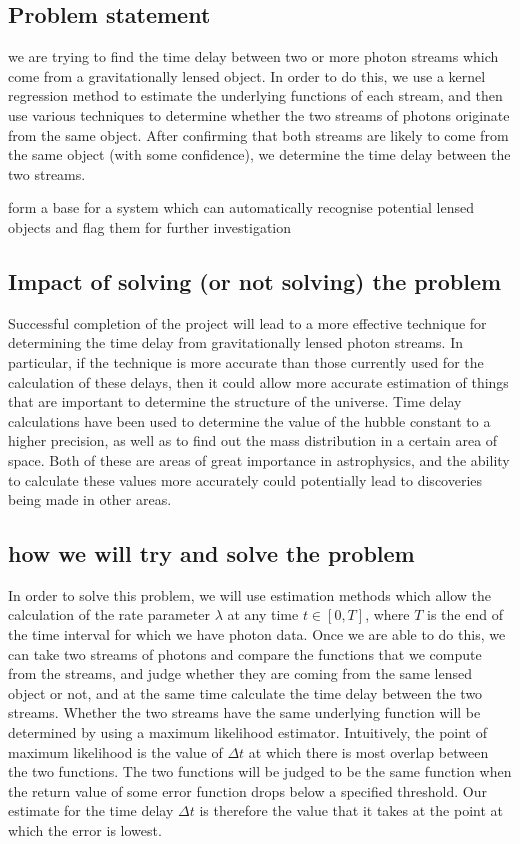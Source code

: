 \documentclass[a4paper,11pt]{article}
\begin{document}
\subsection{Problem statement}
\label{sec-1-1}

   we are trying to find the time delay between two or more photon
   streams which come from a gravitationally lensed object. In order
   to do this, we use a kernel regression method to estimate the
   underlying functions of each stream, and then use various
   techniques to determine whether the two streams of photons
   originate from the same object. After confirming that both streams
   are likely to come from the same object (with some confidence), we
   determine the time delay between the two streams.

form a base for a system which can automatically recognise potential
lensed objects and flag them for further investigation
\subsection{Impact of solving (or not solving) the problem}
\label{sec-1-2}

   Successful completion of the project will lead to a more effective
   technique for determining the time delay from gravitationally
   lensed photon streams. In particular, if the technique is more
   accurate than those currently used for the calculation of these
   delays, then it could allow more accurate estimation of things that
   are important to determine the structure of the universe. Time
   delay calculations have been used to determine the value of the
   hubble constant to a higher precision, as well as to find out the
   mass distribution in a certain area of space. Both of these are
   areas of great importance in astrophysics, and the ability to
   calculate these values more accurately could potentially lead to
   discoveries being made in other areas.
\subsection{how we will try and solve the problem}
\label{sec-1-3}

   In order to solve this problem, we will use estimation methods
   which allow the calculation of the rate parameter $\lambda$ at any
   time $t \in[0,T]$, where $T$ is the end of the time interval for
   which we have photon data. Once we are able to do this, we can take
   two streams of photons and compare the functions that we compute
   from the streams, and judge whether they are coming from the same
   lensed object or not, and at the same time calculate the time delay
   between the two streams. Whether the two streams have the same
   underlying function will be determined by using a maximum
   likelihood estimator. Intuitively, the point of maximum likelihood
   is the value of $\Delta t$ at which there is most overlap between
   the two functions. The two functions will be judged to be the same
   function when the return value of some error function drops below a
   specified threshold. Our estimate for the time delay $\Delta t$ is
   therefore the value that it takes at the point at which the error
   is lowest.
\end{document}
